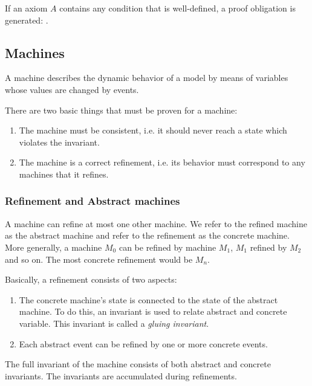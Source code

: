 If an axiom $A$ contains any condition that is well-defined, a proof obligation is generated:
.


\subsection{Machines}
\label{machine}
A machine describes the dynamic behavior of a model by means of variables whose values are changed by events.

There are two basic things that must be proven for a machine:
\begin{enumerate}
	\item The machine must be consistent, i.e. it should never reach a state which violates the invariant.
	\item The machine is a correct refinement, i.e. its behavior must correspond to any machines that it refines.
\end{enumerate}

\subsubsection{Refinement and Abstract machines}
\label{abstract_machine}
A machine can refine at most one other machine. 
We refer to the refined machine as the abstract machine and refer to the refinement as the concrete machine. 
More generally, a machine $M_0$ can be refined by machine $M_1$, $M_1$ refined by $M_2$ 
and so on. The most concrete refinement would be $M_n$. 

Basically, a refinement consists of two aspects:
\begin{enumerate}
	\item The concrete machine's state is connected to the state of the
      abstract machine. To do this, an invariant is used to relate abstract and concrete variable. 
      This invariant is called a \emph{gluing invariant}. 
	\item Each abstract event can be refined by one or more
concrete events.
\end{enumerate}

The full invariant of the machine consists of both abstract and concrete invariants. 
The invariants are accumulated during refinements.

